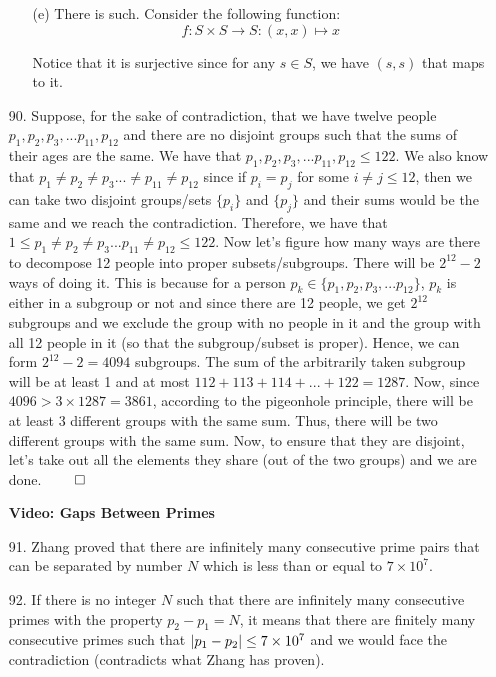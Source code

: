 \documentclass[12pt, a4paper]{article}
\DeclarePairedDelimiter\abs{\lvert}{\rvert}
\newcommand{\rarr}{\rightarrow}
\begin{document}
\begin{itemize}
\begin{itemize}
\item[]

\item[(e)]
There is such. Consider the following function:
$$f : S \times S \rarr S : (x, x) \mapsto x$$

Notice that it is surjective since for any $s \in S$, we have
$(s, s)$ that maps to it.
\end{itemize}

\item[90.]
Suppose, for the sake of contradiction, that we have twelve people $p_1, p_2, p_3, ... p_{11}, p_{12}$ and
there are no disjoint groups such that the sums of their ages are the same. 
We have that $p_1, p_2, p_3, ... p_{11}, p_{12} \leq 122$. We also know that
$p_1 \neq p_2 \neq p_3 ... \neq p_{11} \neq p_{12}$ since if $p_i = p_j$ for some $i \neq j \leq 12$,
then we can take two disjoint groups/sets $\{p_i\}$ and $\{p_j\}$ and their sums would be the same and we reach the contradiction.
Therefore, we have that $1 \leq p_1 \neq p_2 \neq p_3 ... p_{11} \neq p_{12} \leq 122$. Now let's figure
how many ways are there to decompose 12 people into proper subsets/subgroups. There will be $2^{12} - 2$ ways of doing it.
This is because for a person $p_k \in \{p_1, p_2, p_3, ... p_12\}$, $p_k$ is either in a subgroup or not and since there are 12 people,
we get $2^{12}$ subgroups and we exclude the group with no people in it and the group with all 12 people in it (so that the subgroup/subset is proper).
Hence, we can form $2^{12} - 2 = 4094$ subgroups. The sum of the arbitrarily taken subgroup will be at least 1 and at most $112 + 113 + 114 + ... + 122 = 1287$.
Now, since $4096 > 3 \times 1287 = 3861$, according to the pigeonhole principle, there will be at least 3 different groups with the same sum. Thus, there will be
two different groups with the same sum. Now, to ensure that they are disjoint, let's take out all the elements they share (out of the two groups) and we are done.
$\qed$

\item[]
\item[]

{\Large \textbf{Video: Gaps Between Primes}}

\item[91.]
Zhang proved that there are infinitely many consecutive prime pairs that can be separated by number $N$ which is less than or equal to $7 \times 10^7$.

\item[92.]
If there is no integer $N$ such that there are infinitely many consecutive primes with the property $p_2 - p_1 = N$,
it means that there are finitely many consecutive primes such that $\abs{p_1 - p_2} \leq 7 \times 10^7$ and
we would face the contradiction (contradicts what Zhang has proven).


\end{itemize}
\end{document}
